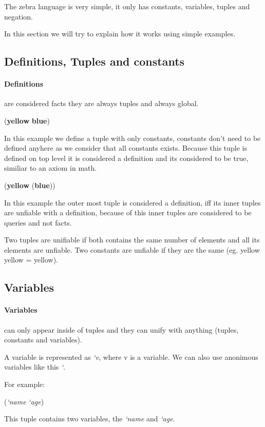 \documentclass[11pt,a4paper]{report}
\newcommand{\var}[1]{`#1}
\newcommand{\zconst}[1]{\textbf{#1}}
\newcommand{\zvar}[1]{\textit{\var{#1}}}
\newcommand{\zunify}[3]{#1 \texttimes #2 = #3}
\newcommand{\zexample}[1]{\begin{center} #1 \end{center}}
\begin{document}
The zebra language is very simple, it only has constants, variables, tuples and negation.

In this section we will try to explain how it works using simple examples.

\subsection{Definitions, Tuples and constants}
    \paragraph{Definitions} are considered facts they are always tuples and always global.

    \zexample{(\zconst{yellow} \zconst{blue})}
    
    In this example we define a tuple with only constants, constants don't need to be defined anyhere as we consider that all constants exists.
    Because this tuple is defined on top level it is considered a definition and its considered to be true, similiar to an axiom in math.

    \zexample{(\zconst{yellow} (\zconst{blue}))}
    
    In this example the outer most tuple is considered a definition, iff its inner tuples are unfiable with a definition, because of this 
    inner tuples are considered to be queries and not facts.
    
    Two tuples are unifiable if both contains the same number of elements and all its elements are unfiable.
    Two constants are unfiable if they are the same (eg. \zunify{yellow}{yellow}{yellow}).

\subsection{Variables}
    \paragraph{Variables} can only appear inside of tuples and they can unify with anything (tuples, constants and variables).
    
    A variable is represented as \zvar{v}, where v is a variable. We can also use anonimous variables like this \zvar{}.

    For example:
    \zexample{(\zvar{name} \zvar{age})}

    This tuple contains two variables, the \zvar{name} and \zvar{age}.
\end{document}
